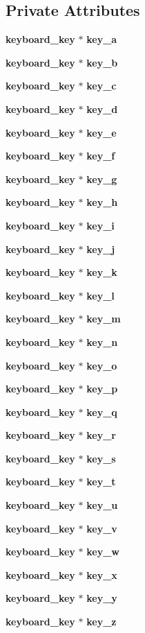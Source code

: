 \subsection*{Private Attributes}
\begin{CompactItemize}
\item 
{\bf keyboard\_\-key} $\ast$ {\bf key\_\-a}
\item 
{\bf keyboard\_\-key} $\ast$ {\bf key\_\-b}
\item 
{\bf keyboard\_\-key} $\ast$ {\bf key\_\-c}
\item 
{\bf keyboard\_\-key} $\ast$ {\bf key\_\-d}
\item 
{\bf keyboard\_\-key} $\ast$ {\bf key\_\-e}
\item 
{\bf keyboard\_\-key} $\ast$ {\bf key\_\-f}
\item 
{\bf keyboard\_\-key} $\ast$ {\bf key\_\-g}
\item 
{\bf keyboard\_\-key} $\ast$ {\bf key\_\-h}
\item 
{\bf keyboard\_\-key} $\ast$ {\bf key\_\-i}
\item 
{\bf keyboard\_\-key} $\ast$ {\bf key\_\-j}
\item 
{\bf keyboard\_\-key} $\ast$ {\bf key\_\-k}
\item 
{\bf keyboard\_\-key} $\ast$ {\bf key\_\-l}
\item 
{\bf keyboard\_\-key} $\ast$ {\bf key\_\-m}
\item 
{\bf keyboard\_\-key} $\ast$ {\bf key\_\-n}
\item 
{\bf keyboard\_\-key} $\ast$ {\bf key\_\-o}
\item 
{\bf keyboard\_\-key} $\ast$ {\bf key\_\-p}
\item 
{\bf keyboard\_\-key} $\ast$ {\bf key\_\-q}
\item 
{\bf keyboard\_\-key} $\ast$ {\bf key\_\-r}
\item 
{\bf keyboard\_\-key} $\ast$ {\bf key\_\-s}
\item 
{\bf keyboard\_\-key} $\ast$ {\bf key\_\-t}
\item 
{\bf keyboard\_\-key} $\ast$ {\bf key\_\-u}
\item 
{\bf keyboard\_\-key} $\ast$ {\bf key\_\-v}
\item 
{\bf keyboard\_\-key} $\ast$ {\bf key\_\-w}
\item 
{\bf keyboard\_\-key} $\ast$ {\bf key\_\-x}
\item 
{\bf keyboard\_\-key} $\ast$ {\bf key\_\-y}
\item 
{\bf keyboard\_\-key} $\ast$ {\bf key\_\-z}

\end{CompactItemize}
